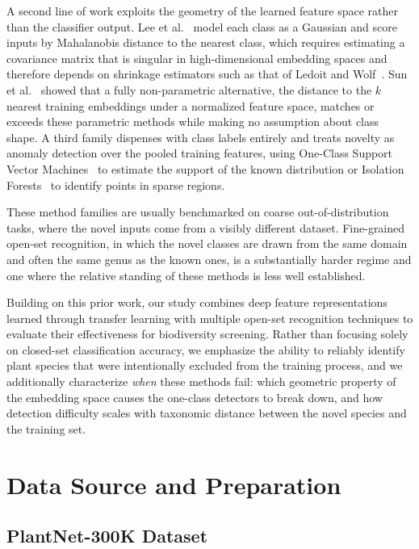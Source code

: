 \documentclass[11pt]{article}
\begin{document}
A second line of work exploits the geometry of the learned feature space rather than the classifier output. Lee et al.~\cite{lee2018simple} model each class as a Gaussian and score inputs by Mahalanobis distance to the nearest class, which requires estimating a covariance matrix that is singular in high-dimensional embedding spaces and therefore depends on shrinkage estimators such as that of Ledoit and Wolf~\cite{ledoit2004well}. Sun et al.~\cite{sun2022knnood} showed that a fully non-parametric alternative, the distance to the $k$ nearest training embeddings under a normalized feature space, matches or exceeds these parametric methods while making no assumption about class shape. A third family dispenses with class labels entirely and treats novelty as anomaly detection over the pooled training features, using One-Class Support Vector Machines~\cite{scholkopf2001estimating} to estimate the support of the known distribution or Isolation Forests~\cite{liu2008isolation} to identify points in sparse regions.

These method families are usually benchmarked on coarse out-of-distribution tasks, where the novel inputs come from a visibly different dataset. Fine-grained open-set recognition, in which the novel classes are drawn from the same domain and often the same genus as the known ones, is a substantially harder regime and one where the relative standing of these methods is less well established.

Building on this prior work, our study combines deep feature representations learned through transfer learning with multiple open-set recognition techniques to evaluate their effectiveness for biodiversity screening. Rather than focusing solely on closed-set classification accuracy, we emphasize the ability to reliably identify plant species that were intentionally excluded from the training process, and we additionally characterize \emph{when} these methods fail: which geometric property of the embedding space causes the one-class detectors to break down, and how detection difficulty scales with taxonomic distance between the novel species and the training set.


\section{Data Source and Preparation}

\subsection{PlantNet-300K Dataset}
\end{document}
